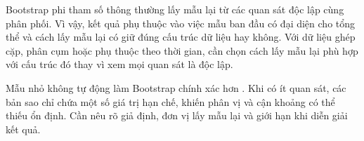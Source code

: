 Bootstrap phi tham số thông thường lấy mẫu lại từ các quan sát độc lập cùng
phân phối. Vì vậy, kết quả phụ thuộc vào việc mẫu ban đầu có đại diện cho
tổng thể và cách lấy mẫu lại có giữ đúng cấu trúc dữ liệu hay không. Với dữ
liệu ghép cặp, phân cụm hoặc phụ thuộc theo thời gian, cần chọn cách lấy mẫu
lại phù hợp với cấu trúc đó thay vì xem mọi quan sát là độc lập.

Mẫu nhỏ không tự động làm Bootstrap chính xác hơn \cite{efron1993, davison1997}. Khi có ít quan sát, các bản sao chỉ chứa một số giá trị hạn chế, khiến phân vị và cận khoảng có thể thiếu ổn định. Cần nêu rõ giả định, đơn vị lấy mẫu lại và giới hạn khi diễn giải kết quả.

